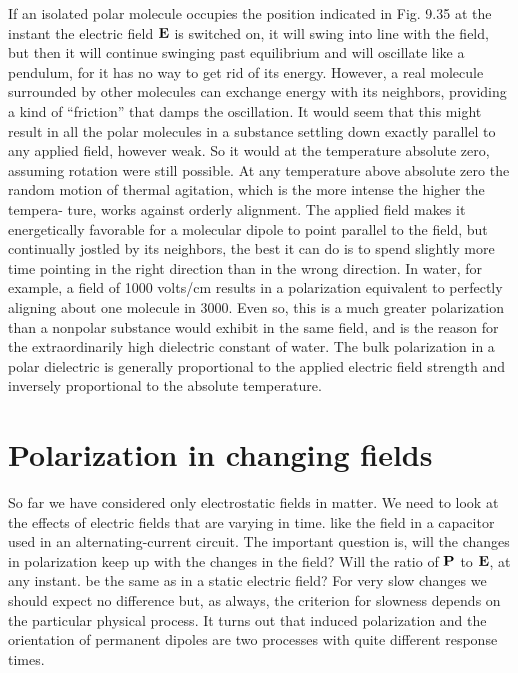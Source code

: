 If an isolated polar molecule occupies the position indicated in
Fig. 9.35 at the instant the electric field $\mathbf{E}$ is switched on, it will swing
into line with the field, but then it will continue swinging past equilibrium
and will oscillate like a pendulum, for it has no way to get
rid of its energy. However, a real molecule surrounded by other
molecules can exchange energy with its neighbors, providing a kind
of ``friction'' that damps the oscillation. It would seem that this
might result in all the polar molecules in a substance settling down
exactly parallel to any applied field, however weak. So it would at
the temperature absolute zero, assuming rotation were still possible.
At any temperature above absolute zero the random motion of
thermal agitation, which is the more intense the higher the tempera-
ture, works against orderly alignment. The applied field makes it
energetically favorable for a molecular dipole to point parallel to
the field, but continually jostled by its neighbors, the best it can do
is to spend slightly more time pointing in the right direction than in
the wrong direction. In water, for example, a field of 1000 volts/cm
results in a polarization equivalent to perfectly aligning about one
molecule in 3000. Even so, this is a much greater polarization than
a nonpolar substance would exhibit in the same field, and is the
reason for the extraordinarily high dielectric constant of water. The
bulk polarization in a polar dielectric is generally proportional to
the applied electric field strength and inversely proportional to the
absolute temperature.

\section{Polarization in changing fields}

So far we have considered only electrostatic fields in matter. We
need to look at the effects of electric fields that are varying in time.
like the field in a capacitor used in an alternating-current circuit.
The important question is, will the changes in polarization keep up
with the changes in the field? Will the ratio of $\mathbf{P}$ to $\mathbf{E}$, at any instant.
be the same as in a static electric field? For very slow changes we
should expect no difference but, as always, the criterion for slowness
depends on the particular physical process. It turns out that induced
polarization and the orientation of permanent dipoles are two
processes with quite different response times.

